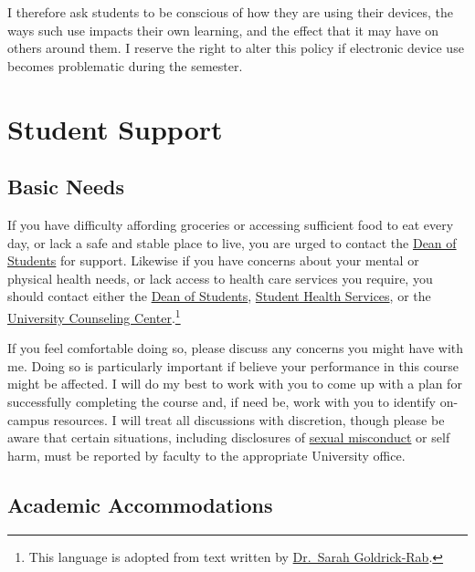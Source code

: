 \documentclass[]{book}
\begin{document}
I therefore ask students to be conscious of how they are using their devices, the ways such use impacts their own learning, and the effect that it may have on others around them. I reserve the right to alter this policy if electronic device use becomes problematic during the semester.

\hypertarget{student-support}{%
\section{Student Support}\label{student-support}}

\hypertarget{basic-needs}{%
\subsection{Basic Needs}\label{basic-needs}}

If you have difficulty affording groceries or accessing sufficient food to eat every day, or lack a safe and stable place to live, you are urged to contact the \href{https://www.slu.edu/student-development/dean-of-students/index.php}{Dean of Students} for support. Likewise if you have concerns about your mental or physical health needs, or lack access to health care services you require, you should contact either the \href{https://www.slu.edu/student-development/dean-of-students/index.php}{Dean of Students}, \href{https://www.slu.edu/life-at-slu/student-health/index.php}{Student Health Services}, or the \href{https://www.slu.edu/life-at-slu/university-counseling/index.php}{University Counseling Center}.\footnote{This language is adopted from text written by \href{https://medium.com/@saragoldrickrab/basic-needs-security-and-the-syllabus-d24cc7afe8c9}{Dr.~Sarah Goldrick-Rab}.}

If you feel comfortable doing so, please discuss any concerns you might have with me. Doing so is particularly important if believe your performance in this course might be affected. I will do my best to work with you to come up with a plan for successfully completing the course and, if need be, work with you to identify on-campus resources. I will treat all discussions with discretion, though please be aware that certain situations, including disclosures of \href{/compassionate-coursework.html}{sexual misconduct} or self harm, must be reported by faculty to the appropriate University office.

\hypertarget{academic-accommodations}{%
\subsection{Academic Accommodations}\label{academic-accommodations}}
\end{document}
